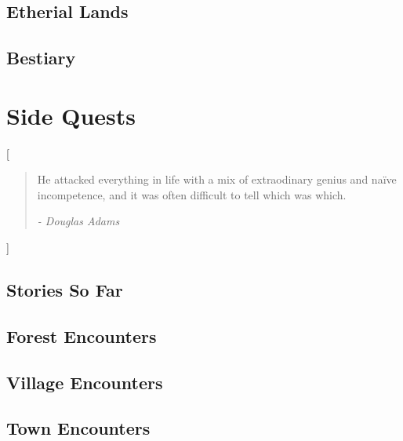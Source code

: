 \documentclass[a4paper,openany]{report}
\begin{document}



\chapter{Etherial Lands}




\chapter{Bestiary}





\part{Side Quests}[\vspace{4cm}\begin{quote}
\center He attacked everything in life with a mix of extraodinary genius and na\"ive incompetence, and it was often difficult to tell which was which.

	\flushright\textit{- Douglas Adams}
\end{quote}

\vspace{3cm}

]

\chapter{Stories So Far}



\chapter{Forest Encounters}

\newcommand{\lescounter}{\addtocounter{enc}{-1}}




\chapter{Village Encounters}



\chapter{Town Encounters}






\printglossary

\label{lastpage}

\printindex


\end{document}
